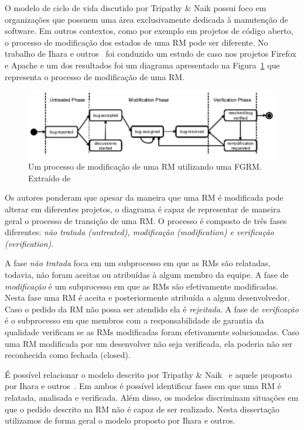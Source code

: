 O modelo de ciclo de vida discutido por Tripathy \& Naik possui foco em
organizações que possuem uma área exclusivamente dedicada à manutenção de
software. Em outros contextos, como por exemplo em projetos de código aberto, o
processo de modificação dos estados de uma RM pode ser diferente. No trabalho de
Ihara e outros~\cite{ihara2009analysis} foi conduzido um estudo de caso nos
projetos Firefox e Apache e um dos resultados foi um diagrama apresentado na
Figura~\ref{fig:diagrama-estado-rm-codigo-aberto} que representa o processo de
modificação de uma RM\@.

\begin{figure}[htpb]
	\centering
    \includegraphics[width=0.8\linewidth]{./chapter-manutencao-software-visao-geral/img/diagrama-estado-rm-codigo-aberto.pdf}
	\caption{Um processo de modificação de uma RM utilizando uma FGRM\@. Extraído
	de~\cite{ihara2009analysis}}
\label{fig:diagrama-estado-rm-codigo-aberto}
\end{figure}

Os autores ponderam que apesar da maneira que uma RM é modificada pode alterar
em diferentes projetos, o diagrama é capaz de representar de maneira geral o
processo de transição de uma RM\@. O processo é composto de três fases
diferentes: \textit{não tratada (untreated), modificação (modification) e
    verificação (verification)}.

A fase \textit{não tratada} foca em um subprocesso em que as RMs são relatadas,
todavia, não foram aceitas ou atribuídas à algum membro da equipe. A fase de
\textit{modificação} é um subprocesso em que as RMs são efetivamente modificadas.
Nesta fase uma RM é aceita e posteriormente atribuída a algum desenvolvedor.
Caso o pedido da RM não possa ser atendido ela é \textit{rejeitada}.  A fase de
\textit{verificação} é o subprocesso em que membros com a responsabilidade de
garantia da qualidade verificam se as RMs modificadas foram efetivamente
solucionadas. Caso uma RM modificada por um desenvolver não seja verificada, ela
poderia não ser reconhecida como fechada (closed).

É possível relacionar o modelo descrito por Tripathy \&
Naik~\cite{tripathy2014software} e aquele proposto por Ihara e
outros~\cite{ihara2009analysis}. Em ambos é possível identificar fases em que
uma RM é relatada, analisada e verificada. Além disso, os modelos discriminam
situações em que o pedido descrito na RM não é capaz de ser realizado. Nesta
dissertação utilizamos de forma geral o modelo proposto por Ihara e outros.

